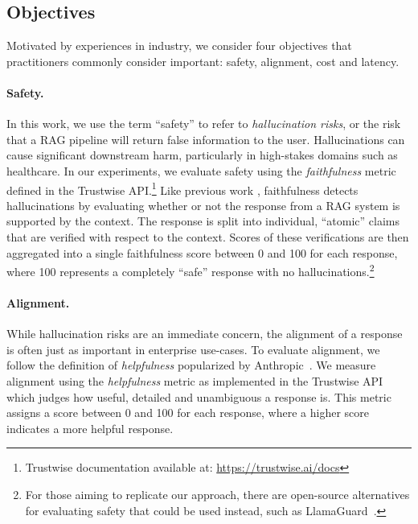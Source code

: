 \subsection{Objectives}
\label{sec:objectives}

Motivated by experiences in industry, we consider four objectives that practitioners commonly consider important: safety, alignment, cost and latency.

\paragraph{Safety.} In this work, we use the term ``safety'' to refer to \emph{hallucination risks}, or the risk that a RAG pipeline will return false information to the user. Hallucinations can cause significant downstream harm, particularly in high-stakes domains such as healthcare.
In our experiments, we evaluate safety using the \emph{faithfulness} metric defined in the Trustwise API.\footnote{\label{docnote} Trustwise documentation available at: \url{https://trustwise.ai/docs}} Like previous work \citep{min2023factscore, es2023ragas}, faithfulness detects hallucinations by evaluating whether or not the response from a RAG system is supported by the context. The response is split into individual, ``atomic'' claims that are verified with respect to the context. Scores of these verifications are then aggregated into a single faithfulness score between 0 and 100 for each response, where 100 represents a completely ``safe'' response with no hallucinations.\footnote{For those aiming to replicate our approach, there are open-source alternatives for evaluating safety that could be used instead, such as LlamaGuard~\citep{inan2023llama}.}

\paragraph{Alignment.}
While hallucination risks are an immediate concern, the alignment of a response is often just as important in enterprise use-cases. To evaluate alignment, we follow the definition of \emph{helpfulness} popularized by Anthropic~\citep{bai2022training}. We measure alignment using the \emph{helpfulness} metric as implemented in the Trustwise API which judges how useful, detailed and unambiguous a response is. This metric assigns a score between 0 and 100 for each response, where a higher score indicates a more helpful response.

